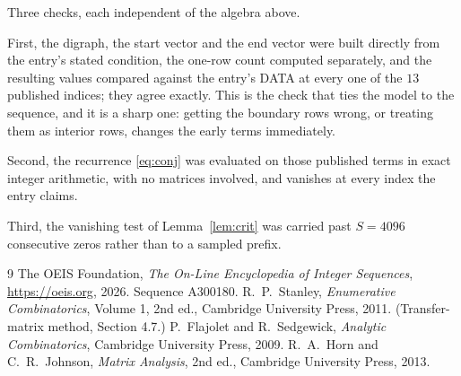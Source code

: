 \documentclass[11pt,a4paper]{article}
\theoremstyle{plain}
\theoremstyle{definition}
\begin{document}
Three checks, each independent of the algebra above.

First, the digraph, the start vector and the end vector were built directly from the
entry's stated condition, the one-row count computed separately, and the resulting values
compared against the entry's DATA at every one of the $13$ published indices; they
agree exactly. This is the check that ties the model to the sequence, and it is a sharp one:
getting the boundary rows wrong, or treating them as interior rows, changes the early terms
immediately.

Second, the recurrence \eqref{eq:conj} was evaluated on those published terms in exact
integer arithmetic, with no matrices involved, and vanishes at every index the entry claims.

Third, the vanishing test of Lemma~\ref{lem:crit} was carried past $S=4096$ consecutive
zeros rather than to a sampled prefix.

\begin{thebibliography}{9}
 The OEIS Foundation, \emph{The On-Line Encyclopedia of Integer
Sequences}, \url{https://oeis.org}, 2026. Sequence A300180.
 R.~P.~Stanley, \emph{Enumerative Combinatorics}, Volume 1, 2nd ed.,
Cambridge University Press, 2011. (Transfer-matrix method, Section 4.7.)
 P.~Flajolet and R.~Sedgewick, \emph{Analytic Combinatorics}, Cambridge
University Press, 2009.
 R.~A.~Horn and C.~R.~Johnson, \emph{Matrix Analysis}, 2nd ed., Cambridge
University Press, 2013.
\end{thebibliography}
\end{document}
